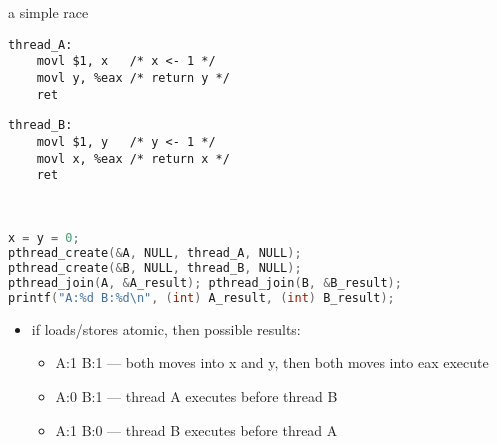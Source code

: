 \begin{frame}[fragile,label=loadReorderSetup]{a simple race}
\begin{minipage}{0.45\textwidth}
\begin{lstlisting}[language=myasm,style=smaller]
thread_A:
    movl $1, x   /* x <- 1 */
    movl y, %eax /* return y */
    ret
\end{lstlisting}
\end{minipage}
\begin{minipage}{0.45\textwidth}
\begin{lstlisting}[language=myasm,style=smaller]
thread_B:
    movl $1, y   /* y <- 1 */
    movl x, %eax /* return x */
    ret
\end{lstlisting}
\end{minipage}
\\
\begin{lstlisting}[language=C++,style=smaller]
x = y = 0;
pthread_create(&A, NULL, thread_A, NULL);
pthread_create(&B, NULL, thread_B, NULL);
pthread_join(A, &A_result); pthread_join(B, &B_result);
printf("A:%d B:%d\n", (int) A_result, (int) B_result);
\end{lstlisting}
\begin{itemize}
\item<2-> if loads/stores atomic, then possible results:
    \begin{itemize}
    \item A:1 B:1 --- both moves into x and y, then both moves into eax execute
    \item A:0 B:1 --- thread A executes before thread B
    \item A:1 B:0 --- thread B executes before thread A
    \end{itemize}
\end{itemize}
\end{frame}

